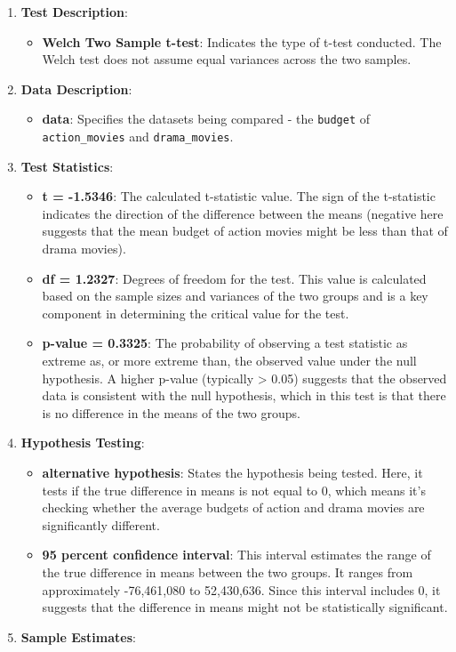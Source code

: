 \documentclass[
]{book}
\providecommand{\tightlist}{%
  \setlength{\itemsep}{0pt}\setlength{\parskip}{0pt}}
\begin{document}
\begin{enumerate}
\def\labelenumi{\arabic{enumi}.}
\tightlist
\item
  \textbf{Test Description}:

  \begin{itemize}
  \tightlist
  \item
    \textbf{Welch Two Sample t-test}: Indicates the type of t-test conducted. The Welch test does not assume equal variances across the two samples.
  \end{itemize}
\item
  \textbf{Data Description}:

  \begin{itemize}
  \tightlist
  \item
    \textbf{data}: Specifies the datasets being compared - the \texttt{budget} of \texttt{action\_movies} and \texttt{drama\_movies}.
  \end{itemize}
\item
  \textbf{Test Statistics}:

  \begin{itemize}
  \tightlist
  \item
    \textbf{t = -1.5346}: The calculated t-statistic value. The sign of the t-statistic indicates the direction of the difference between the means (negative here suggests that the mean budget of action movies might be less than that of drama movies).
  \item
    \textbf{df = 1.2327}: Degrees of freedom for the test. This value is calculated based on the sample sizes and variances of the two groups and is a key component in determining the critical value for the test.
  \item
    \textbf{p-value = 0.3325}: The probability of observing a test statistic as extreme as, or more extreme than, the observed value under the null hypothesis. A higher p-value (typically \textgreater{} 0.05) suggests that the observed data is consistent with the null hypothesis, which in this test is that there is no difference in the means of the two groups.
  \end{itemize}
\item
  \textbf{Hypothesis Testing}:

  \begin{itemize}
  \tightlist
  \item
    \textbf{alternative hypothesis}: States the hypothesis being tested. Here, it tests if the true difference in means is not equal to 0, which means it's checking whether the average budgets of action and drama movies are significantly different.
  \item
    \textbf{95 percent confidence interval}: This interval estimates the range of the true difference in means between the two groups. It ranges from approximately -76,461,080 to 52,430,636. Since this interval includes 0, it suggests that the difference in means might not be statistically significant.
  \end{itemize}
\item
  \textbf{Sample Estimates}:


\end{enumerate}
\end{document}
